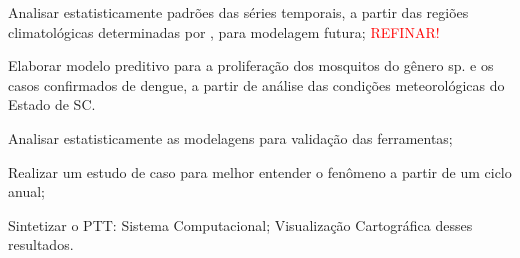 \begin{alineas}
\item Analisar estatisticamente padrões das séries temporais, a partir das regiões climatológicas determinadas por , para modelagem futura; \textcolor{red}{REFINAR!}
\item Elaborar modelo preditivo para a proliferação dos mosquitos do gênero  sp. e os casos confirmados de dengue, a partir de análise das condições meteorológicas do Estado de \acrlong{SC}.
\item Analisar estatisticamente as modelagens para validação das ferramentas;
\item Realizar um estudo de caso para melhor entender o fenômeno a partir de um ciclo anual;
\item Sintetizar o \acrfull{PTT}:
\subitem Sistema Computacional;
\subitem Visualização Cartográfica desses resultados.
\end{alineas}

